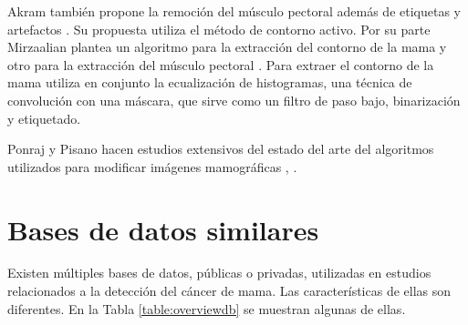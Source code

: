 Akram también propone la remoción del músculo pectoral además de etiquetas y
artefactos \cite{akram2013preprocessing}. Su propuesta utiliza el método de
contorno activo. Por su parte Mirzaalian plantea un algoritmo para la
extracción del contorno de la mama y otro para la extracción del músculo
pectoral \cite{mirzaalian2007pre}. Para extraer el contorno de la mama utiliza
en conjunto la ecualización de histogramas, una técnica de convolución con una
máscara, que sirve como un filtro de paso bajo, binarización y etiquetado.


Ponraj y Pisano hacen estudios extensivos del estado del arte del algoritmos
utilizados para modificar imágenes mamográficas \cite{ponraj2011survey},
\cite{pisano2000image}.

\section{Bases de datos similares}

Existen múltiples bases de datos, públicas o privadas, utilizadas en estudios
relacionados a la detección del cáncer de mama. Las características de ellas
son diferentes. En la Tabla \ref{table:overviewdb} se muestran algunas de ellas.


